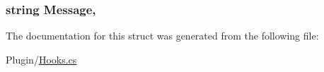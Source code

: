 \subsubsection[{Message}]{\setlength{\rightskip}{0pt plus 5cm}string Message\hspace{0.3cm}{\ttfamily [get]}, {\ttfamily [set]}}\label{structOTA_1_1Plugin_1_1HookArgs_1_1ConsoleMessageReceived_a40e8debace0cc6f4f7baa0fdd309c103}


The documentation for this struct was generated from the following file\+:\begin{DoxyCompactItemize}
\item 
Plugin/\hyperlink{Hooks_8cs}{Hooks.\+cs}\end{DoxyCompactItemize}
